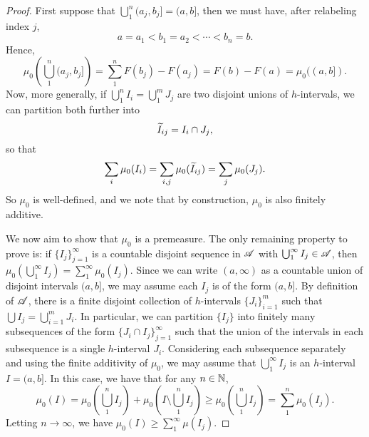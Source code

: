 \documentclass[12pt]{article} %
\begin{document}
\begin{proof}
    First suppose that $\bigcup_1^n (a_j, b_j] = (a, b]$, then we must have, after relabeling index $j$, \[a = a_1 < b_1 = a_2 < \cdots < b_n = b.\] Hence, \[\mu_0 \left( \bigcup_1^n (a_j, b_j] \right) = \sum_1^n F(b_j) - F(a_j) = F(b) - F(a) = \mu_0((a, b]).\]
    Now, more generally, if $\bigcup_1^n I_i = \bigcup_1^m J_j$ are two disjoint unions of $h$-intervals, we can partition both further into \[\widetilde{I}_{ij} = I_i \cap J_j,\] so that \[\sum_i \mu_0(I_i) = \sum_{i, j} \mu_0(\widetilde{I}_{ij}) = \sum_j \mu_0(J_j).\] So $\mu_0$ is well-defined, and we note that by construction, $\mu_0$ is also finitely additive.

    We now aim to show that $\mu_0$ is a premeasure. The only remaining property to prove is: if $\{I_j\}_{j=1}^{\infty}$ is a countable disjoint sequence in $\mathscr{A}$ with $\bigcup_1^\infty I_j \in \mathscr{A}$, then $\mu_0\left(\bigcup_1^\infty I_j\right) = \sum_1^\infty \mu_0(I_j)$. Since we can write $(a, \infty)$ as a countable union of disjoint intervals $(a, b]$, we may assume each $I_j$ is of the form $(a, b]$. By definition of $\mathscr{A}$, there is a finite disjoint collection of $h$-intervals $\{J_{i}\}_{i=1}^{m}$ such that $\bigcup I_j = \bigcup_{i=1}^{m} J_i$. In particular, we can partition $\{I_j\}$ into finitely many subsequences of the form $\{J_i \cap I_j\}_{j=1}^{\infty}$ such that the union of the intervals in each subsequence is a single $h$-interval $J_i$. Considering each subsequence separately and using the finite additivity of $\mu_0$, we may assume that $\bigcup_1^\infty I_j$ is an $h$-interval $I = (a, b]$. In this case, we have that for any $n \in \mathbb{N}$, \[\mu_0(I) = \mu_0\left( \bigcup_1^n I_j \right) + \mu_0 \left( I \setminus \bigcup_1^n I_j \right) \geq \mu_0\left(\bigcup_1^n I_j \right) = \sum_1^n \mu_0(I_j).\] Letting $n \to \infty$, we have $\mu_0(I) \geq \sum_1^\infty \mu(I_j)$.


\end{proof}
\end{document}
